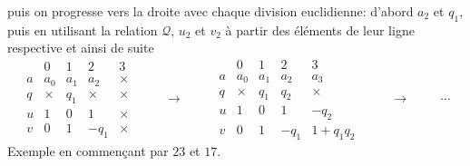 puis on progresse vers la droite avec chaque division euclidienne: d'abord $a_2$ et $q_1$, puis en utilisant la relation $\mathcal Q$,  $u_2$ et $v_2$ à partir des éléments de leur ligne respective et ainsi de suite
\begin{displaymath}
\begin{array}{l|l|l|l|l}
 & 0 & 1 & 2 & 3 \\ \hline
a & a_0 & a_1 & a_2 & \times \\ 
q & \times   & q_1 & \times   & \times \\ 
u & 1   & 0   & 1 & \times \\
v & 0   & 1   & -q_1 & \times
\end{array}
\hspace{1cm}\rightarrow\hspace{1cm}
\begin{array}{l|l|l|l|l}
 & 0 & 1 & 2 & 3 \\ \hline
a & a_0 & a_1 & a_2 & a_3 \\ 
q & \times   & q_1 & q_2   & \times \\ 
u & 1   & 0   & 1 & -q_2 \\
v & 0   & 1   & -q_1 & 1+q_1q_2
\end{array}
\hspace{1cm}\rightarrow \hspace{1cm}\cdots
\end{displaymath}
Exemple en commençant par $23$ et $17$.
